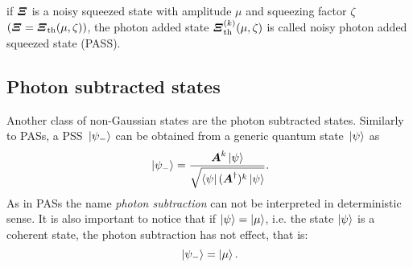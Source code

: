         if $\bm{\relax{\varXi}}$ is a noisy squeezed state with amplitude $\mu$ and squeezing factor 
        $\zeta$ $(\bm{\relax{\varXi}}=\bm{\relax{\varXi}}_{\mathrm{th}}(\mu,\zeta))$, the photon added state 
        $\bm{\relax{\varXi}}_{\mathrm{th}}^{(k)}(\mu,\zeta)$ is called noisy photon added squeezed state 
        (PASS).

    \subsection{Photon subtracted states}
        Another class of non-Gaussian states are the photon subtracted states. Similarly to PASs, a PSS 
        $\ket*{\psi_-}$ can be obtained from a generic quantum state $\ket*{\psi}$ as
        \begin{equation}
            \ket*{\psi_-} = \frac{\bm{\relax{A}}^k \ket{\psi}}{\sqrt{\bra{\psi}(\bm{\relax{A}}^\dagger)^k\ket{\psi}}}.
        \end{equation}
        As in PASs the name \emph{photon subtraction} can not be interpreted in deterministic sense.
        It is also important to notice that if $\ket{\psi}=\ket{\mu}$, i.e. the state $\ket{\psi}$ is 
        a coherent state, the photon subtraction has not effect, that is:
        \begin{equation*}
            \ket*{\psi_-}=\ket{\mu}.
        \end{equation*}